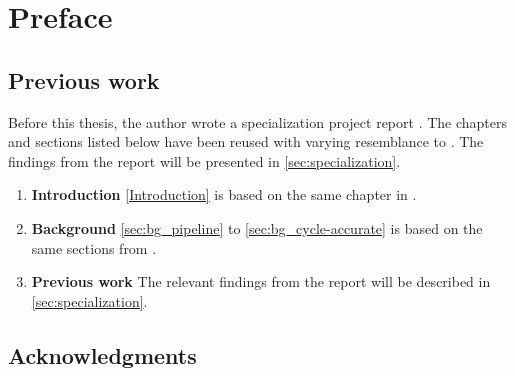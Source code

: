 \chapter*{Preface}


\section{Previous work}

Before this thesis, the author wrote a specialization project report \cite{torjenygaardeikenesDesigningRISCVReference2023}. The chapters and sections listed below have been reused with varying resemblance to \cite{torjenygaardeikenesDesigningRISCVReference2023}. The findings from the report will be presented in \cref{sec:specialization}.


\begin{enumerate}
    \item \textbf{Introduction} \cref{Introduction} is based on the same chapter in \cite{torjenygaardeikenesDesigningRISCVReference2023}.
    \item \textbf{Background} \cref{sec:bg_pipeline} to \cref{sec:bg_cycle-accurate} is based on the same sections from \cite{torjenygaardeikenesDesigningRISCVReference2023}.
    \item \textbf{Previous work} The relevant findings from the report will be described in \cref{sec:specialization}.
\end{enumerate}





%
%
%
%

\section{Acknowledgments}


